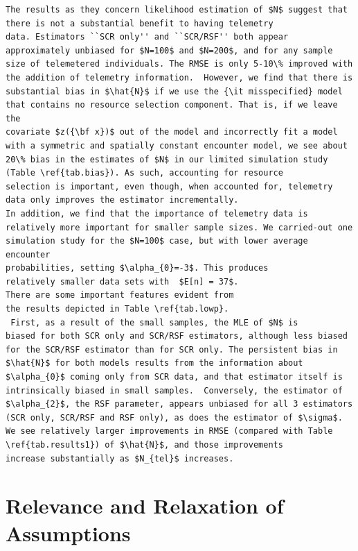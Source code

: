 \begin{verbatim}
The results as they concern likelihood estimation of $N$ suggest that
there is not a substantial benefit to having telemetry
data. Estimators ``SCR only'' and ``SCR/RSF'' both appear
approximately unbiased for $N=100$ and $N=200$, and for any sample
size of telemetered individuals. The RMSE is only 5-10\% improved with
the addition of telemetry information.  However, we find that there is
substantial bias in $\hat{N}$ if we use the {\it misspecified} model
that contains no resource selection component. That is, if we leave the
covariate $z({\bf x})$ out of the model and incorrectly fit a model
with a symmetric and spatially constant encounter model, we see about
20\% bias in the estimates of $N$ in our limited simulation study
(Table \ref{tab.bias}). As such, accounting for resource
selection is important, even though, when accounted for, telemetry
data only improves the estimator incrementally.
In addition, we find that the importance of telemetry data is
relatively more important for smaller sample sizes. We carried-out one
simulation study for the $N=100$ case, but with lower average encounter
probabilities, setting $\alpha_{0}=-3$. This produces
relatively smaller data sets with  $E[n] = 37$. 
There are some important features evident from
the results depicted in Table \ref{tab.lowp}.
 First, as a result of the small samples, the MLE of $N$ is
biased for both SCR only and SCR/RSF estimators, although less biased
for the SCR/RSF estimator than for SCR only. The persistent bias in
$\hat{N}$ for both models results from the information about
$\alpha_{0}$ coming only from SCR data, and that estimator itself is
intrinsically biased in small samples.  Conversely, the estimator of
$\alpha_{2}$, the RSF parameter, appears unbiased for all 3 estimators
(SCR only, SCR/RSF and RSF only), as does the estimator of $\sigma$.
We see relatively larger improvements in RMSE (compared with Table
\ref{tab.results1}) of $\hat{N}$, and those improvements
increase substantially as $N_{tel}$ increases.
\end{verbatim}


\section{Relevance and Relaxation of Assumptions}


